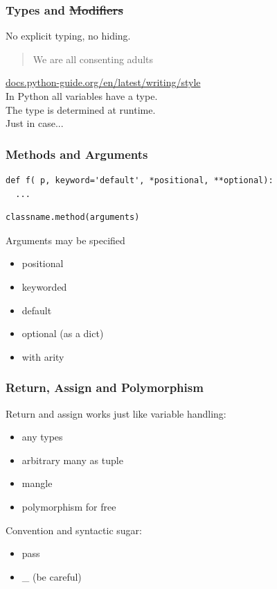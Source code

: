 \documentclass{beamer}
\begin{document}
\begin{frame}[fragile]
\frametitle{Types and \sout{Modifiers}}
No explicit typing, no hiding.\\
\huge \begin{quote}We are all consenting adults\end{quote}
\scriptsize \href{http://docs.python-guide.org/en/latest/writing/style/}{docs.python-guide.org/en/latest/writing/style}\\
\normalsize
\hbox{}
In Python all variables have a type.\\
The type is determined at runtime.\\
\hbox{}
\hbox{}
\hbox{}
\hfill Just in case...
\end{frame}

\begin{frame}[fragile]
\frametitle{Methods and Arguments }

\begin{verbatim}
def f( p, keyword='default', *positional, **optional):
  ...
\end{verbatim}

\begin{verbatim}classname.method(arguments)\end{verbatim}
\hbox{}
Arguments may be specified
\begin{itemize}
	\item positional
	\item keyworded
	\item default
	\item optional (as a dict)
	\item with arity 
\end{itemize}
\end{frame}



\begin{frame}[fragile]
\frametitle{Return, Assign and Polymorphism}%
Return and assign works just like variable handling:
\begin{itemize}
	\item any types
	\item arbitrary many as tuple
	\item mangle
	\item polymorphism for free
\end{itemize}
\hbox{}
Convention and syntactic sugar:
\begin{itemize}
	\item pass
	\item \_ (be careful)
\end{itemize}

\end{frame}
\end{document}
